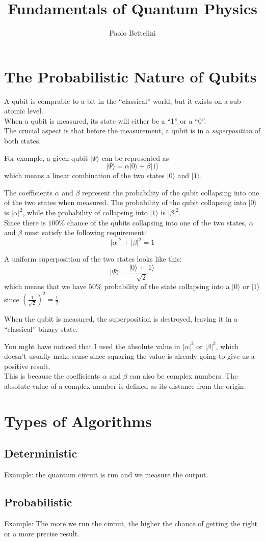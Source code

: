\documentclass{article}
\title{Fundamentals of Quantum Physics }
\author{Paolo Bettelini}
\date{}
\newcommand{\quotes}[1]{``#1''}
\begin{document}
\maketitle
\tableofcontents
\pagebreak

\section{The Probabilistic Nature of Qubits}

A qubit is comprable to a bit in the \quotes{classical} world, but it exists on a sub-atomic level. \\
When a qubit is measured, its state will either be a \quotes{1} or a \quotes{0}. \\
The crucial aspect is that before the measurement, a qubit is in a \textit{superposition} of both states.

For example, a given qubit \(|\Psi\rangle\) can be represented as
\[
    |\Psi\rangle=\alpha |0\rangle+\beta |1\rangle
\]
which means a linear combination of the two states \(|0\rangle\) and \(|1\rangle\).

The coefficients \(\alpha\) and \(\beta\) represent the probability of the qubit collapsing into one of the two states when measured.
The probability of the qubit collapsing into \(|0\rangle\) is \(|\alpha|^2\),
while the probability of collapsing into \(|1\rangle\) is \(|\beta|^2\). \\
Since there is \(100\%\) chance of the qubits collapsing into one of the two states, \(\alpha\) and \(\beta\) must satisfy the following requirement:
\[
    |\alpha|^2+|\beta|^2=1
\]

A uniform superposition of the two states looks like this:
\[
    |\Psi\rangle=\frac{|0\rangle+|1\rangle}{\sqrt{2}}
\]
which means that we have \(50\%\) probability of the state collapsing into a \(|0\rangle\) or \(|1\rangle\)
since \(\left(\frac{1}{\sqrt{2}}\right)^2=\frac{1}{2}\).

When the qubit is measured, the superposition is destroyed, leaving it in a \quotes{classical} binary state.

You mght have noticed that I used the absolute value in \(|\alpha|^2\) or \(|\beta|^2\), which doesn't usually make sense since squaring the value is already going to give us a positive result.
\\
This is because the coefficients \(\alpha\) and \(\beta\) can also be complex numbers. The absolute value of a complex number is defined as its distance from the origin.

\section{Types of Algorithms}
\subsection{Deterministic}
Example: the quantum circuit is run and we measure the output.
\subsection{Probabilistic}
Example: The more we run the circuit, the higher the chance of getting the right or a more precise result.
\end{document}
